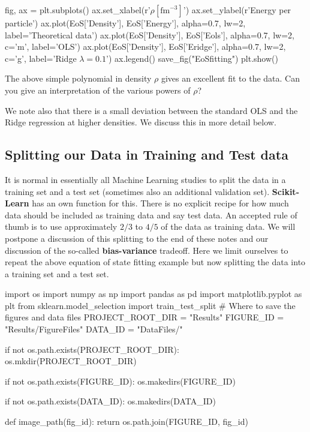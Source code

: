 \documentclass[%
oneside,                 %
final,                   %
10pt]{article}
\begin{document}
fig, ax = plt.subplots()
ax.set_xlabel(r'$\rho[\mathrm{fm}^{-3}]$')
ax.set_ylabel(r'Energy per particle')
ax.plot(EoS['Density'], EoS['Energy'], alpha=0.7, lw=2,
            label='Theoretical data')
ax.plot(EoS['Density'], EoS['Eols'], alpha=0.7, lw=2, c='m',
            label='OLS')
ax.plot(EoS['Density'], EoS['Eridge'], alpha=0.7, lw=2, c='g',
            label='Ridge $\lambda = 0.1$')
ax.legend()
save_fig("EoSfitting")
plt.show()
\epycod

The above simple polynomial in density $\rho$ gives an excellent fit
to the data. Can you give an interpretation of the various powers of $\rho$?

We note also that there is a small deviation between the
standard OLS and the Ridge regression at higher densities. We discuss this in more detail
below.


\subsection{Splitting our Data in Training and Test data}

It is normal in essentially all Machine Learning studies to split the
data in a training set and a test set (sometimes also an additional
validation set).  \textbf{Scikit-Learn} has an own function for this. There
is no explicit recipe for how much data should be included as training
data and say test data.  An accepted rule of thumb is to use
approximately $2/3$ to $4/5$ of the data as training data. We will
postpone a discussion of this splitting to the end of these notes and
our discussion of the so-called \textbf{bias-variance} tradeoff. Here we
limit ourselves to repeat the above equation of state fitting example
but now splitting the data into a training set and a test set.

\bpycod
import os
import numpy as np
import pandas as pd
import matplotlib.pyplot as plt
from sklearn.model_selection import train_test_split
# Where to save the figures and data files
PROJECT_ROOT_DIR = "Results"
FIGURE_ID = "Results/FigureFiles"
DATA_ID = "DataFiles/"

if not os.path.exists(PROJECT_ROOT_DIR):
    os.mkdir(PROJECT_ROOT_DIR)

if not os.path.exists(FIGURE_ID):
    os.makedirs(FIGURE_ID)

if not os.path.exists(DATA_ID):
    os.makedirs(DATA_ID)

def image_path(fig_id):
    return os.path.join(FIGURE_ID, fig_id)
\end{document}
